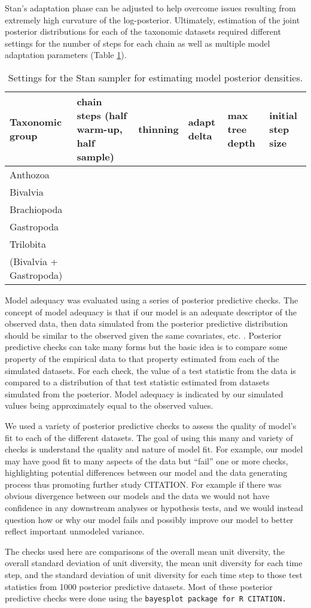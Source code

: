 \documentclass[12pt,letterpaper]{article}
\begin{document}
Stan's adaptation phase can be adjusted to help overcome issues resulting from extremely high curvature of the log-posterior. Ultimately, estimation of the joint posterior distributions for each of the taxonomic datasets required different settings for the number of steps for each chain as well as multiple model adaptation parameters (Table \ref{tab:sampler}).

\begin{table}
  \centering
  \begin{tabular}{ l l l l l l }
    Taxonomic group & chain steps (half warm-up, half sample) & thinning & adapt delta & max tree depth & initial step size \\
    \hline
    Anthozoa & & & & & \\
    Bivalvia & & & & & \\
    Brachiopoda & & & & & \\
    Gastropoda & & & & & \\
    Trilobita & & & & & \\
    (Bivalvia + Gastropoda) & & & & & \\
  \end{tabular}
  \caption{Settings for the Stan sampler for estimating model posterior densities.}
  \label{tab:sampler}
\end{table}


Model adequacy was evaluated using a series of posterior predictive checks. The concept of model adequacy is that if our model is an adequate descriptor of the observed data, then data simulated from the posterior predictive distribution should be similar to the observed given the same covariates, etc. \citep{Gelman2013d}. Posterior predictive checks can take many forms but the basic idea is to compare some property of the empirical data to that property estimated from each of the simulated datasets. For each check, the value of a test statistic from the data is compared to a distribution of that test statistic estimated from datasets simulated from the posterior. Model adequacy is indicated by our simulated values being approximately equal to the observed values.

We used a variety of posterior predictive checks to assess the quality of model's fit to each of the different datasets. The goal of using this many and variety of checks is understand the quality and nature of model fit. For example, our model may have good fit to many aspects of the data but ``fail'' one or more checks, highlighting potential differences between our model and the data generating process thus promoting further study CITATION. For example if there was obvious divergence between our models and the data we would not have confidence in any downstream analyses or hypothesis tests, and we would instead question how or why our model fails and possibly improve our model to better reflect important unmodeled variance.

The checks used here are comparisons of the overall mean unit diversity, the overall standard deviation of unit diversity, the mean unit diversity for each time step, and the standard deviation of unit diversity for each time step to those test statistics from 1000 posterior predictive datasets. Most of these posterior predictive checks were done using the \tt{bayesplot} package for R CITATION.
\end{document}
